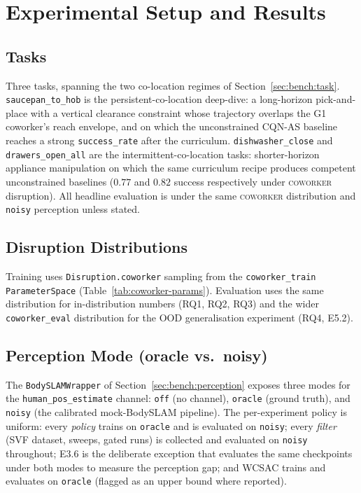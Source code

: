 \documentclass[11pt,a4paper]{report}
\newcommand{\cqnas}{CQN-AS}
\newcommand{\coworker}{\textsc{coworker}}
\newcommand{\bodyslampp}{BodySLAM\nolinebreak[4]\hspace{-.05em}\raisebox{.2ex}{\scriptsize ++}}
\begin{document}
\chapter{Experimental Setup and Results}
\label{ch:eval}

\section{Tasks}
\label{sec:setup:tasks}

Three tasks, spanning the two co-location regimes of
Section~\ref{sec:bench:task}. \texttt{saucepan\_to\_hob} is the
persistent-co-location deep-dive: a long-horizon pick-and-place with
a vertical clearance constraint whose trajectory overlaps the G1
coworker's reach envelope, and on which the unconstrained \cqnas{}
baseline reaches a strong \texttt{success\_rate} after the
curriculum. \texttt{dishwasher\_close} and
\texttt{drawers\_open\_all} are the intermittent-co-location tasks:
shorter-horizon appliance manipulation on which the same curriculum
recipe produces competent unconstrained baselines ($0.77$ and $0.82$
success respectively under \coworker{} disruption). All headline
evaluation is under the same \coworker{} distribution and
\texttt{noisy} perception unless stated.

\section{Disruption Distributions}
\label{sec:setup:disruptions}

Training uses \texttt{Disruption.coworker} sampling from the
\texttt{coworker\_train} \texttt{ParameterSpace}
(Table~\ref{tab:coworker-params}). Evaluation uses the same
distribution for in-distribution numbers (RQ1, RQ2, RQ3) and the
wider \texttt{coworker\_eval} distribution for the OOD
generalisation experiment (RQ4, E5.2).

\section{Perception Mode (oracle vs.\ noisy)}
\label{sec:setup:perception-mode}

The \texttt{BodySLAMWrapper} of Section~\ref{sec:bench:perception}
exposes three modes for the \texttt{human\_pos\_estimate} channel:
\texttt{off} (no channel), \texttt{oracle} (ground truth), and
\texttt{noisy} (the calibrated mock-\bodyslampp{} pipeline). The
per-experiment policy is uniform: every \emph{policy} trains on
\texttt{oracle} and is evaluated on \texttt{noisy}; every
\emph{filter} (SVF dataset, sweeps, gated runs) is collected and
evaluated on \texttt{noisy} throughout; E3.6 is the deliberate
exception that evaluates the same checkpoints under both modes to
measure the perception gap; and WCSAC trains and evaluates on
\texttt{oracle} (flagged as an upper bound where reported).
\end{document}
